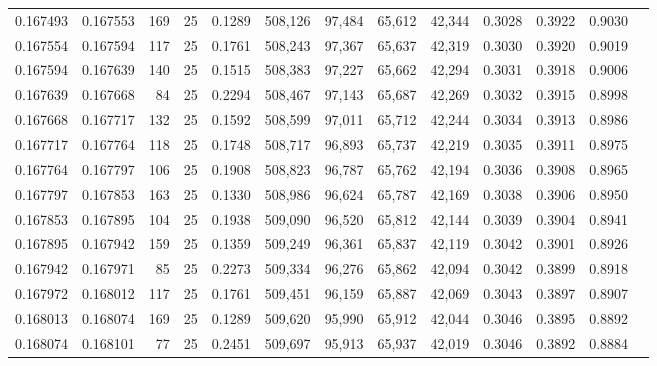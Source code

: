 \begin{tabular}{rrrrrrrrrrrrr}
0.167493 & 0.167553 &   169 &  25 &                                     0.1289 & 508,126 &  97,484 &  65,612 &  42,344 & 0.3028 & 0.3922 & 0.9030 \\
0.167554 & 0.167594 &   117 &  25 &                                     0.1761 & 508,243 &  97,367 &  65,637 &  42,319 & 0.3030 & 0.3920 & 0.9019 \\
0.167594 & 0.167639 &   140 &  25 &                                     0.1515 & 508,383 &  97,227 &  65,662 &  42,294 & 0.3031 & 0.3918 & 0.9006 \\
0.167639 & 0.167668 &    84 &  25 &                                     0.2294 & 508,467 &  97,143 &  65,687 &  42,269 & 0.3032 & 0.3915 & 0.8998 \\
0.167668 & 0.167717 &   132 &  25 &                                     0.1592 & 508,599 &  97,011 &  65,712 &  42,244 & 0.3034 & 0.3913 & 0.8986 \\
0.167717 & 0.167764 &   118 &  25 &                                     0.1748 & 508,717 &  96,893 &  65,737 &  42,219 & 0.3035 & 0.3911 & 0.8975 \\
0.167764 & 0.167797 &   106 &  25 &                                     0.1908 & 508,823 &  96,787 &  65,762 &  42,194 & 0.3036 & 0.3908 & 0.8965 \\
0.167797 & 0.167853 &   163 &  25 &                                     0.1330 & 508,986 &  96,624 &  65,787 &  42,169 & 0.3038 & 0.3906 & 0.8950 \\
0.167853 & 0.167895 &   104 &  25 &                                     0.1938 & 509,090 &  96,520 &  65,812 &  42,144 & 0.3039 & 0.3904 & 0.8941 \\
0.167895 & 0.167942 &   159 &  25 &                                     0.1359 & 509,249 &  96,361 &  65,837 &  42,119 & 0.3042 & 0.3901 & 0.8926 \\
0.167942 & 0.167971 &    85 &  25 &                                     0.2273 & 509,334 &  96,276 &  65,862 &  42,094 & 0.3042 & 0.3899 & 0.8918 \\
0.167972 & 0.168012 &   117 &  25 &                                     0.1761 & 509,451 &  96,159 &  65,887 &  42,069 & 0.3043 & 0.3897 & 0.8907 \\
0.168013 & 0.168074 &   169 &  25 &                                     0.1289 & 509,620 &  95,990 &  65,912 &  42,044 & 0.3046 & 0.3895 & 0.8892 \\
0.168074 & 0.168101 &    77 &  25 &                                     0.2451 & 509,697 &  95,913 &  65,937 &  42,019 & 0.3046 & 0.3892 & 0.8884 \\

\end{tabular}
